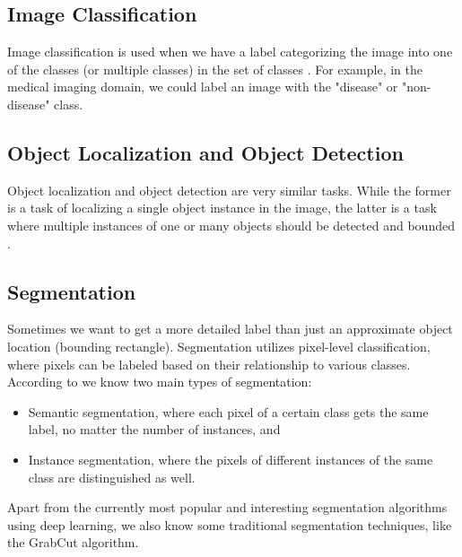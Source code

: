 \subsection{Image Classification}
Image classification is used when we have a label categorizing the image into one of the classes (or multiple classes) in the set of classes \cite{Alam2021}. For example, in the medical imaging domain, we could label an image with the "disease" or "non-disease" class.

\subsection{Object Localization and Object Detection}
Object localization and object detection are very similar tasks. While the former is a task of localizing a single object instance in the image, the latter is a task where multiple instances of one or many objects should be detected and bounded \cite{Alam2021}.

\subsection{Segmentation} Sometimes we want to get a more detailed label than just an approximate object location (bounding rectangle). Segmentation utilizes pixel-level classification, where pixels can be labeled based on their relationship to various classes. According to \cite{Alam2021} we know two main types of segmentation:

\begin{itemize}
    \item Semantic segmentation, where each pixel of a certain class gets the same label, no matter the number of instances, and
    \item Instance segmentation, where the pixels of different instances of the same class are distinguished as well.
\end{itemize}

Apart from the currently most popular and interesting segmentation algorithms using deep learning, we also know some traditional segmentation techniques, like the GrabCut algorithm.

